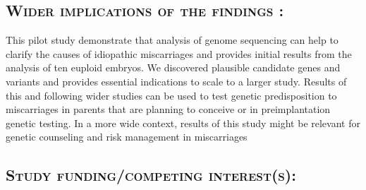 \subsection*{\textsc{Wider implications of the findings :}} 
This pilot study demonstrate that analysis of genome sequencing can help to clarify the causes of idiopathic miscarriages and provides initial results from the analysis of ten euploid embryos. We discovered plausible candidate genes and variants and provides essential indications to scale to a larger study. Results of this and following wider studies can be used to test genetic predisposition to miscarriages in parents that are planning to conceive or in preimplantation genetic testing. In a more wide context, results of this study might be relevant for genetic counseling and risk management in miscarriages

\subsection*{\textsc{Study funding/competing interest(s):}} %

